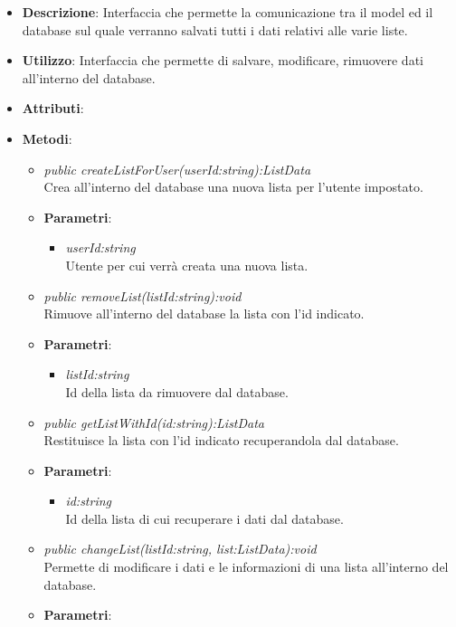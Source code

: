 \begin{itemize}
\item \textbf{Descrizione}: Interfaccia che permette la comunicazione tra il model ed il database sul quale verranno salvati tutti i dati relativi alle varie liste.
\item \textbf{Utilizzo}: Interfaccia che permette di salvare, modificare, rimuovere dati all'interno del database.
\item \textbf{Attributi}: 
\item \textbf{Metodi}:
	\begin{itemize}
	\item \textit{public createListForUser(userId:string):ListData}\\
		Crea all'interno del database una nuova lista per l'utente impostato.
			\item{\textbf{Parametri}: \begin{itemize}
			\item \textit{userId:string}\\
			Utente per cui verrà creata una nuova lista.
			\end{itemize}}
	\item \textit{public removeList(listId:string):void}\\
	Rimuove all'interno del database la lista con l'id indicato.
			\item{\textbf{Parametri}: \begin{itemize}
			\item \textit{listId:string}\\
				Id della lista da rimuovere dal database.
			\end{itemize}}
	\item \textit{public getListWithId(id:string):ListData}\\
	Restituisce la lista con l'id indicato recuperandola dal database.
			\item{\textbf{Parametri}: \begin{itemize}
			\item \textit{id:string}\\
			Id della lista di cui recuperare i dati dal database.
			\end{itemize}}
	\item \textit{public changeList(listId:string, list:ListData):void}\\
		Permette di modificare i dati e le informazioni di una lista all'interno del database.
			\item{\textbf{Parametri}: \begin{itemize}

\end{itemize}}
\end{itemize}
\end{itemize}
